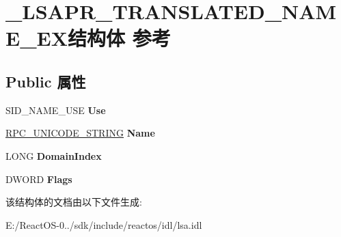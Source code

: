 \hypertarget{struct___l_s_a_p_r___t_r_a_n_s_l_a_t_e_d___n_a_m_e___e_x}{}\section{\+\_\+\+L\+S\+A\+P\+R\+\_\+\+T\+R\+A\+N\+S\+L\+A\+T\+E\+D\+\_\+\+N\+A\+M\+E\+\_\+\+E\+X结构体 参考}
\label{struct___l_s_a_p_r___t_r_a_n_s_l_a_t_e_d___n_a_m_e___e_x}
\subsection*{Public 属性}
\begin{DoxyCompactItemize}
\item 
\mbox{\label{struct___l_s_a_p_r___t_r_a_n_s_l_a_t_e_d___n_a_m_e___e_x_ac74b5bc0fb40cb342d0069f155ccaec9}} 
S\+I\+D\+\_\+\+N\+A\+M\+E\+\_\+\+U\+SE {\bfseries Use}
\item 
\mbox{\label{struct___l_s_a_p_r___t_r_a_n_s_l_a_t_e_d___n_a_m_e___e_x_af863f041c481a27017c002d5c18edf18}} 
\hyperlink{struct___r_p_c___u_n_i_c_o_d_e___s_t_r_i_n_g}{R\+P\+C\+\_\+\+U\+N\+I\+C\+O\+D\+E\+\_\+\+S\+T\+R\+I\+NG} {\bfseries Name}
\item 
\mbox{\label{struct___l_s_a_p_r___t_r_a_n_s_l_a_t_e_d___n_a_m_e___e_x_adb0192a8c5ed48b33c244c5d0bef40d6}} 
L\+O\+NG {\bfseries Domain\+Index}
\item 
\mbox{\label{struct___l_s_a_p_r___t_r_a_n_s_l_a_t_e_d___n_a_m_e___e_x_aed39a6b5ade6ef78b47785c8eb38253d}} 
D\+W\+O\+RD {\bfseries Flags}
\end{DoxyCompactItemize}


该结构体的文档由以下文件生成\+:\begin{DoxyCompactItemize}
\item 
E\+:/\+React\+O\+S-\/0../sdk/include/reactos/idl/lsa.\+idl\end{DoxyCompactItemize}
